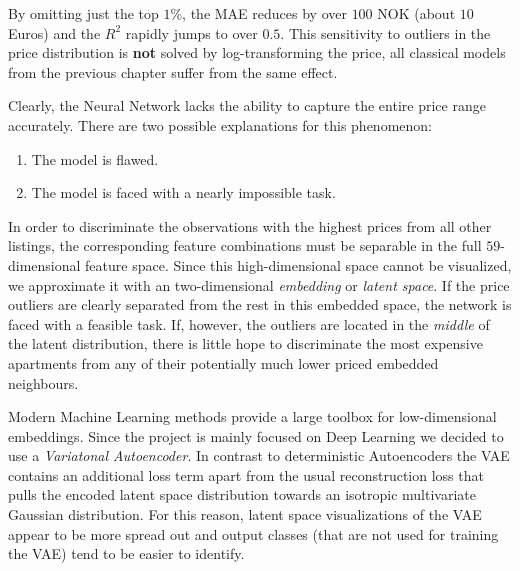 \documentclass[12pt, letterpaper]{article}
\begin{document}
By omitting just the top $1$\%, the MAE reduces by over $100$ NOK (about $10$ Euros) and the $R^2$ rapidly jumps to over $0.5$.
This sensitivity to outliers in the price distribution is \textbf{not} solved by log-transforming the price, all classical models from the previous chapter suffer from the same effect.

Clearly, the Neural Network lacks the ability to capture the entire price range accurately.
There are two possible explanations for this phenomenon:
\begin{enumerate}
    \item The model is flawed.
    \item The model is faced with a nearly impossible task.
\end{enumerate}
In order to discriminate the observations with the highest prices from all other listings, the corresponding feature combinations must be separable in the full $59$-dimensional feature space.
Since this high-dimensional space cannot be visualized, we approximate it with an two-dimensional \emph{embedding} or \emph{latent space}.
If the price outliers are clearly separated from the rest in this embedded space, the network is faced with a feasible task.
If, however, the outliers are located in the \emph{middle} of the latent distribution, there is little hope to discriminate the most expensive apartments from any of their potentially much lower priced embedded neighbours.

Modern Machine Learning methods provide a large toolbox for low-dimensional embeddings.
Since the project is mainly focused on Deep Learning we decided to use a \emph{Variatonal Autoencoder}.
In contrast to deterministic Autoencoders the VAE contains an additional loss term apart from the usual reconstruction loss that pulls the encoded latent space distribution towards an isotropic multivariate Gaussian distribution.
For this reason, latent space visualizations of the VAE appear to be more spread out and output classes (that are not used for training the VAE) tend to be easier to identify.
\end{document}
